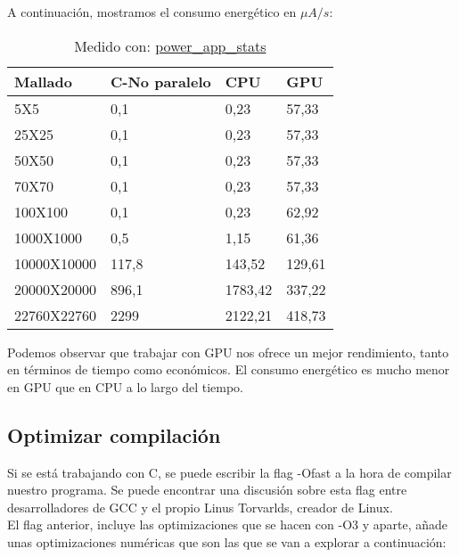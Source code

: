 \begin{ejemplo}
  \newpage
  A continuación, mostramos el consumo energético en $\mu A / s$:
  
  \begin{table}[h]
    \centering
    \begin{tabular}{@{}llll@{}}
      \toprule
      Mallado     & C-No paralelo & CPU     & GPU    \\ \midrule
      5X5         & 0,1           & 0,23    & 57,33  \\
      25X25       & 0,1           & 0,23    & 57,33  \\
      50X50       & 0,1           & 0,23    & 57,33  \\
      70X70       & 0,1           & 0,23    & 57,33  \\
      100X100     & 0,1           & 0,23    & 62,92  \\
      1000X1000   & 0,5           & 1,15    & 61,36  \\
      10000X10000 & 117,8         & 143,52  & 129,61 \\
      20000X20000 & 896,1         & 1783,42 & 337,22 \\
      22760X22760 & 2299          & 2122,21 & 418,73 \\ \bottomrule
    \end{tabular}
    
    \caption{Medido con:  \href{https://github.com/JoseCarlosGarcia95/power_app_stats}{power\_app\_stats}}
  \end{table}

  Podemos observar que trabajar con GPU nos ofrece un mejor rendimiento, tanto en términos de tiempo como económicos. El consumo energético es mucho menor en GPU que en CPU a lo largo del tiempo.
\end{ejemplo}

\subsection{Optimizar compilación}
Si se está trabajando con C, se puede escribir la flag -Ofast a la hora de compilar nuestro programa. Se puede encontrar una discusión sobre esta flag entre desarrolladores de GCC y el propio Linus Torvarlds, creador de Linux. \cite{linusfast} \\
El flag anterior, incluye las optimizaciones que se hacen con -O3 y aparte, añade unas optimizaciones numéricas que son las que se van a explorar a continuación:


